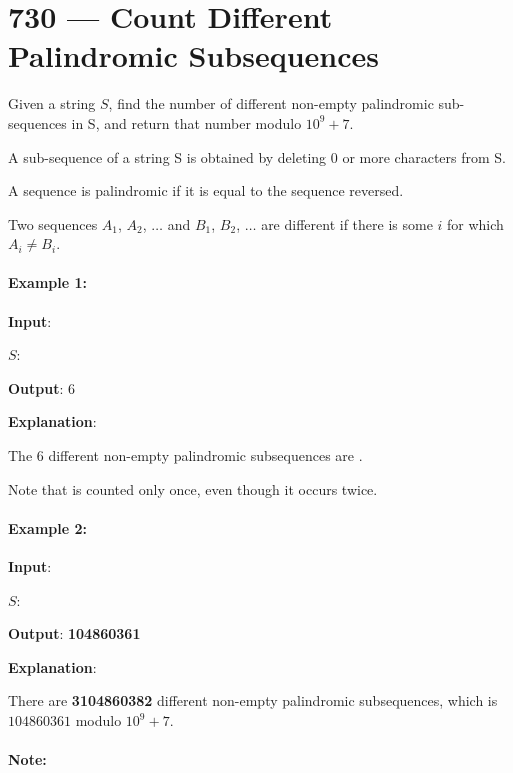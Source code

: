 \section{730 --- Count Different Palindromic Subsequences}
Given a string $S$, find the number of different non-empty palindromic sub-sequences in S, and return that number modulo $10^9 + 7$.

A sub-sequence of a string S is obtained by deleting 0 or more characters from S.

A sequence is palindromic if it is equal to the sequence reversed.

Two sequences $A_1$, $A_2$, $\ldots$ and $B_1$, $B_2$, $\ldots$ are different if there is some $i$ for which $A_i \neq B_i$.

\paragraph{Example 1:}
\begin{flushleft}


\textbf{Input}:
 
$S$: 

\textbf{Output}: 6

\textbf{Explanation}:
 
The 6 different non-empty palindromic subsequences are .

Note that  is counted only once, even though it occurs twice.

\end{flushleft}

\paragraph{Example 2:}
\begin{flushleft}


\textbf{Input}:
 
$S$: 

\textbf{Output}: \textbf{104860361}

\textbf{Explanation}:
 
There are \textbf{3104860382} different non-empty palindromic subsequences, which is $104860361$ modulo $10^9 + 7$.
\end{flushleft}

\paragraph{Note:}

